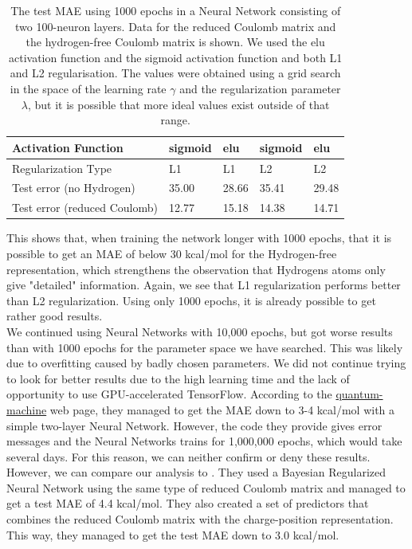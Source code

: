 \documentclass[11pt,a4paper,notitlepage]{article}
\begin{document}
\begin{table}[H]\caption[NN, Test MAE with 1000 epochs]{The test MAE using 1000 epochs in a Neural Network consisting of two 100-neuron layers. Data for the reduced Coulomb matrix and the hydrogen-free Coulomb matrix is shown. We used the elu activation function and the sigmoid activation function and both L1 and L2 regularisation. The values were obtained using a grid search in the space of the learning rate $\gamma$ and the regularization parameter $\lambda$, but it is possible that more ideal values exist outside of that range.}\label{Error_table}
\centering
\begin{tabular}{|l|l|l|l|l|}
\hline

Activation Function          & sigmoid & elu   & sigmoid & elu   \\ \hline
Regularization Type          & L1      & L1    & L2      & L2    \\ \hline
Test error (no Hydrogen)     & 35.00   & 28.66 & 35.41   & 29.48 \\ \hline
Test error (reduced Coulomb) & 12.77   & 15.18 & 14.38   & 14.71 \\ \hline
\end{tabular}
\end{table}
This shows that, when training the network longer with 1000 epochs, that it is possible to get an MAE of below 30 kcal/mol for the Hydrogen-free representation, which strengthens the observation that Hydrogens atoms only give "detailed" information. Again, we see that L1 regularization performs better than L2 regularization. Using only 1000 epochs, it is already possible to get rather good results.
\\
We continued using Neural Networks with 10,000 epochs, but got worse results than with 1000 epochs for the parameter space we have searched. This was likely due to overfitting caused by badly chosen parameters. We did not continue trying to look for better results due to the high learning time and the lack of opportunity to use GPU-accelerated TensorFlow. According to the \href{http://quantum-machine.org/datasets/}{quantum-machine} web page, they managed to get the MAE down to 3-4 kcal/mol with a simple two-layer Neural Network. However, the code they provide gives error messages and the Neural Networks trains for 1,000,000 epochs, which would take several days. For this reason, we can neither confirm or deny these results. However, we can compare our analysis to \citep{Atomization_network}. They used a Bayesian Regularized Neural Network using the same type of reduced Coulomb matrix and managed to get a test MAE of 4.4 kcal/mol. They also created a set of predictors that combines the  reduced Coulomb matrix with the charge-position representation. This way, they managed to get the test MAE down to 3.0 kcal/mol.
\end{document}
